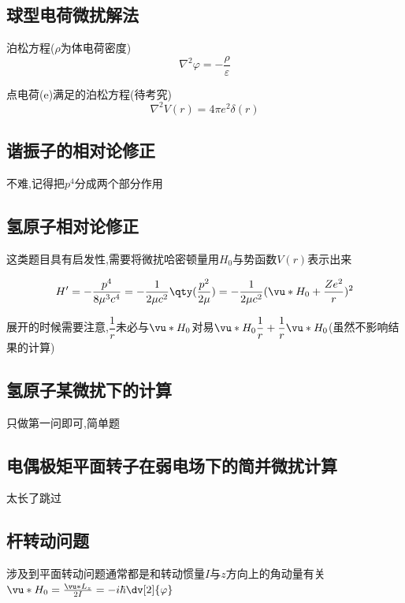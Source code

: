         \subsection{球型电荷微扰解法}
            \begin{formal}
                泊松方程($\rho$为体电荷密度)   
                $$ \nabla^{2} \varphi = - \frac{\rho}{\varepsilon} $$

                点电荷(e)满足的泊松方程(待考究)
                $$ \nabla^{2}V(r) = 4 \pi e^2 \delta(r)$$
            \end{formal}
        
        \subsection{谐振子的相对论修正}
            不难,记得把$p^{4}$分成两个部分作用


        \subsection{氢原子相对论修正}
            这类题目具有启发性,需要将微扰哈密顿量用$H_{0}$与势函数$V(r)$表示出来

            $$ 
            H' = - \dfrac{p^{4}}{8 \mu^{3} c^{4} } = - \dfrac{1}{2\mu c^{2}} \qty(\frac{p^{2}}{2\mu}) 
            = - \dfrac{1}{2 \mu c^{2}} (\vu*{H}_{0} + \frac{Ze^{2}}{r})^{2} 
            $$

            展开的时候需要注意,$\dfrac{1}{r}$未必与$\vu*{H}_{0}$对易$ \vu*{H}_{0} \dfrac{1}{r} + \dfrac{1}{r} \vu*{H}_{0} $(虽然不影响结果的计算)
        

        \subsection{氢原子某微扰下的计算}
            只做第一问即可,简单题

        \subsection{电偶极矩平面转子在弱电场下的简并微扰计算}
            太长了跳过

        \subsection{杆转动问题}
            涉及到平面转动问题通常都是和转动惯量$I$与$z$方向上的角动量有关
                $ \vu*{H}_{0} = \frac{\vu*{L}_{z}}{2I} = - i \hbar \dv[2]{\varphi} $


